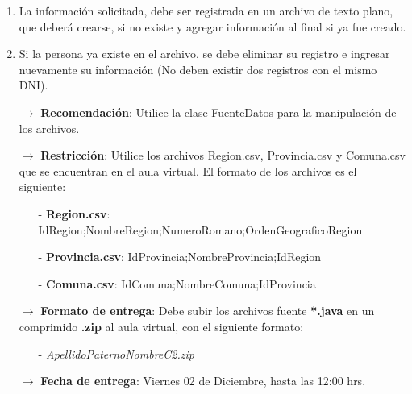 \documentclass[10pt]{article}
\begin{document}
{\begin{enumerate}
\begin{enumerate}
\begin{enumerate}
\begin{itemize}
                \end{itemize}
            \end{enumerate}
            \item La informaci\'on solicitada, debe ser registrada en un archivo de texto plano, que deber\'a crearse, si no existe y agregar informaci\'on al final si ya fue creado.
            \item Si la persona ya existe en el archivo, se debe eliminar su registro e ingresar nuevamente su informaci\'on (No deben existir dos registros con el mismo DNI).
        \end{enumerate}
        \begin{itemize}
            \item[$\rightarrow$] \textbf{Recomendaci\'on}: Utilice la clase FuenteDatos para la manipulaci\'on de los archivos.
            \item[$\rightarrow$] \textbf{Restricci\'on}: Utilice los archivos Region.csv, Provincia.csv y Comuna.csv que se encuentran en el aula virtual. El formato de los archivos es el siguiente:
            \begin{itemize}
                \item[-] \textbf{Region.csv}: IdRegion;NombreRegion;NumeroRomano;OrdenGeograficoRegion
                \item[-] \textbf{Provincia.csv}: IdProvincia;NombreProvincia;IdRegion
                \item[-] \textbf{Comuna.csv}: IdComuna;NombreComuna;IdProvincia
            \end{itemize}
            \item[$\rightarrow$] \textbf{Formato de entrega}: Debe subir los archivos fuente \textbf{*.java} en un comprimido \textbf{.zip} al aula virtual, con el siguiente formato:
            \begin{itemize}
                \item[-] \emph{ApellidoPaternoNombreC2.zip}
            \end{itemize}
            \item[$\rightarrow$] \textbf{Fecha de entrega}: Viernes 02 de Diciembre, hasta las 12:00 hrs.
        \end{itemize}
	\end{enumerate}}
\end{document}

